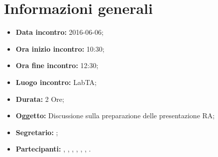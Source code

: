 \newpage
\section{Informazioni generali}
\begin{itemize}
\item \textbf{Data incontro:} 2016-06-06;
\item \textbf{Ora inizio incontro:} 10:30;
\item \textbf{Ora fine incontro:} 12:30;
\item \textbf{Luogo incontro:} LabTA;
\item \textbf{Durata:} 2 Ore;
\item \textbf{Oggetto:} Discussione sulla preparazione delle presentazione RA;
\item \textbf{Segretario:} \GR;
\item \textbf{Partecipanti:} \AF, \FB, \GN, \GR, \MV, \MP, \SM.

\end{itemize}
